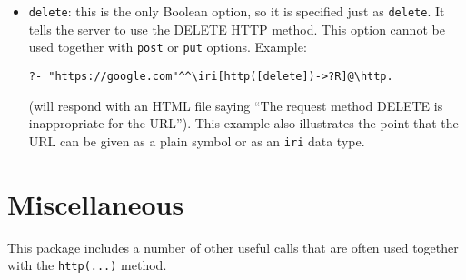 \begin{itemize}
\begin{itemize}
      These options, if given,  
      will contact the server using the HTTP methods POST or PUT, respectively.
      If none of these options is given (and no \texttt{delete} option),
      the GET method is used.
      One cannot specify both of these at once, and the HTTP method must
      match what the server expects. In case of a mismatch, the server may
      (or may not) send an error message back, which would then be
      available in the warnings list mentioned above, or as contents in
      \texttt{?Result}. Example:
\begin{verbatim}
?- 'https://myurl.my'[http([auth='me@my'/'my+pw',
                            post='{"message": "Hello"}'])->?R]@\http.
\end{verbatim}
    \item \texttt{delete}: this is the only Boolean option, so it is
      specified just as \texttt{delete}.
      It tells the server
      to use the DELETE HTTP method. This option cannot be used together with
      \texttt{post} or \texttt{put} options.  Example:
\begin{verbatim}
?- "https://google.com"^^\iri[http([delete])->?R]@\http.
\end{verbatim}
  (will respond with an HTML file saying ``The request method
  DELETE is inappropriate for the URL'').
  This example also illustrates the point that the URL can be given as a
  plain symbol or as an \texttt{\bs{}iri} data type. 
  \end{itemize}
\end{itemize}

\section{Miscellaneous}

This package includes a number of other useful calls that are often used
together with the \texttt{http(...)} method.

